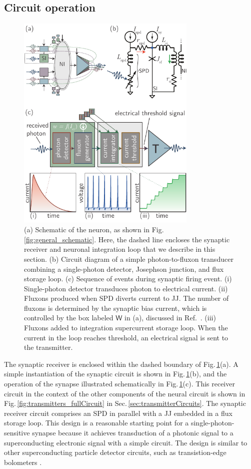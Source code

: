 \documentclass[twocolumn]{article}
\newcommand{\onlinecite}[1]{\hspace{-1 ex} \nocite{#1}\citenum{#1}}
\begin{document}
\subsection{\label{sec:circuitOperation}Circuit operation}
\begin{figure}[t!]
	\centerline{\includegraphics[width=8.6cm]{_receivers_schematic_small.pdf}}
	\caption{\label{fig:receivers_schematic}(a) Schematic of the neuron, as shown in Fig.\,\ref{fig:general_schematic}. Here, the dashed line encloses the synaptic receiver and neuronal integration loop that we describe in this section. (b) Circuit diagram of a simple photon-to-fluxon transducer combining a single-photon detector, Josephson junction, and flux storage loop. (c) Sequence of events during synaptic firing event. (i) Single-photon detector transduces photon to electrical current. (ii) Fluxons produced when SPD diverts current to JJ. The number of fluxons is determined by the synaptic bias current, which is controlled by the box labeled $\mathsf{W}$ in (a), discussed in Ref.\,\onlinecite{sh2018c}. (iii) Fluxons added to integration supercurrent storage loop. When the current in the loop reaches threshold, an electrical signal is sent to the transmitter.}
\end{figure}
The synaptic receiver is enclosed within the dashed boundary of Fig.\,\ref{fig:receivers_schematic}(a). A simple instantiation of the synaptic circuit is shown in Fig.\,\ref{fig:receivers_schematic}(b), and the operation of the synapse illustrated schematically in Fig.\,\ref{fig:receivers_schematic}(c). This receiver circuit in the context of the other components of the neural circuit is shown in Fig.\,\ref{fig:transmitters_fullCircuit} in Sec.\,\ref{sec:transmitterCircuits}. The synaptic receiver circuit comprises an SPD in parallel with a JJ embedded in a flux storage loop. This design is a reasonable starting point for a single-photon-sensitive synapse because it achieves transduction of a photonic signal to a superconducting electronic signal with a simple circuit. The design is similar to other superconducting particle detector circuits, such as transistion-edge bolometers \cite{vatu1998}. 
\end{document}
